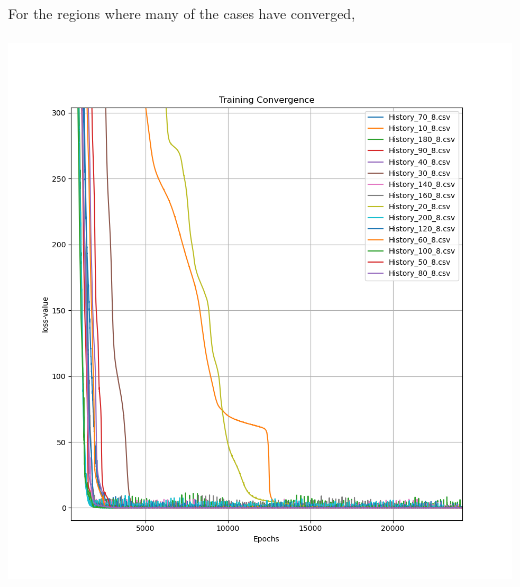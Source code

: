 \documentclass[a4paper, 12pt]{report}
\def\size{0.75}
\begin{document}
\begin{center}
\newpage
For the regions where many of the cases have converged,
\\~\\\includegraphics[scale=\size]{Depth_8_Down.png}

\end{center}
\end{document}
